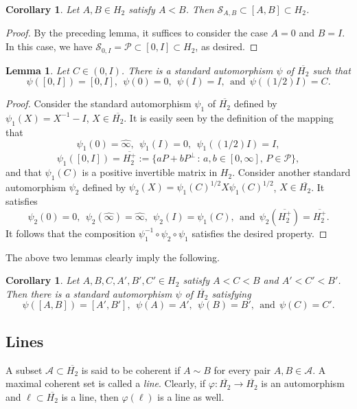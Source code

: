 \documentclass[10pt,a4paper]{amsart}
\providecommand{\index}[1]{}
\newcommand\cP{{\mathcal{P}}}
\newcommand\oH{{\overline{H_2}}}
\newcommand\oHp{{\overline{H_2^+}}}
\newcommand\oi{{\widehat{\infty}}}
\newtheorem{lemma}[theorem]{Lemma}
\newtheorem{corollary}[theorem]{Corollary}
\theoremstyle{definition}
\theoremstyle{remark}
\numberwithin{subsection}{section}
\numberwithin{equation}{section}
\begin{document}
\begin{corollary}\label{A<B}
Let $A, B\in H_2$ satisfy $A<B$. 
Then $\mathcal{S}_{A,B}\subset [A,B]\subset H_2$. 
\end{corollary}
\begin{proof}
By the preceding lemma, it suffices to consider the case $A=0$ and $B=I$. 
In this case, we have $\mathcal{S}_{0,I}=\cP\subset [0,I]\subset H_2$, as desired.
\end{proof}


\begin{lemma}\label{order}
Let $C \in (0,I)$. 
There is a standard automorphism $\psi$ of $\oH$ such that 
\[
\psi([0, I])=[0, I],\ \  \psi(0)=0,\ \  \psi(I)=I,\ \  \text{and}\ \  \psi((1/2)I)=C.
\] 
\end{lemma}

\begin{proof}
Consider the standard automorphism $\psi_1$ of $\oH$ defined by $\psi_1(X)=X^{-1}-I$, $X\in \oH$. 
It is easily seen by the definition of the mapping that 
\[
\psi_1(0)=\oi,\ \ \psi_1(I)=0,\ \  \psi_1((1/2)I)=I,
\]
\[
\psi_1([0, I])=\oHp:=\{aP+bP^{\perp}\,:\, a, b\in [0, \infty],\, P\in \mathcal{P}\}, \index{$Hp$@$\oHp$}
\] and that $\psi_1(C)$ is a positive invertible matrix in $H_2$. 
Consider another standard automorphism $\psi_2$ defined by $\psi_2(X)=\psi_1(C)^{1/2}X\psi_1(C)^{1/2}$, $X\in \oH$. 
It satisfies 
\[
\psi_2(0)=0,\ \ \psi_2(\oi)=\oi,\ \ \psi_2(I)=\psi_1(C),\ \ \text{and}\ \  \psi_2(\oHp)=\oHp.
\] 
It follows that the composition $\psi_1^{-1}\circ\psi_2\circ \psi_1$ satisfies the desired property.
\end{proof}

The above two lemmas clearly imply the following.

\begin{corollary}\label{cororder}
Let $A, B, C, A',B',C'\in H_2$ satisfy $A<C<B$ and $A'<C'<B'$.
Then there is a standard automorphism $\psi$ of $\oH$ satisfying 
\[
\psi([A, B])=[A', B'],\ \  \psi(A)=A',\ \  \psi(B)=B',\ \  \text{and}\ \  \psi(C)=C'.
\] 
\end{corollary}



\subsection{Lines}\label{line}\index{line}
A subset $\mathcal{A} \subset \oH$ is said to be coherent \index{coherent set} if $A \sim B$ for every pair $A,B \in \mathcal{A}$. A maximal coherent set is called a \emph{line}\index{line}. Clearly, if $\varphi \colon \oH \to \oH$ is an automorphism and $\ell \subset \oH$ is a line, then $\varphi ( \ell)$ is a line as well.
\end{document}
